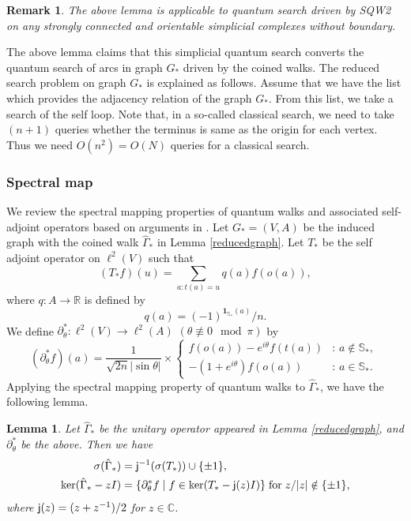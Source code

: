 \documentclass[a4paper,12pt]{article}
\newtheorem{lemma}[definition]{Lemma}
\newtheorem{remark}[definition]{Remark}
\newcommand{\bs}[1]{\boldsymbol{#1}}
\numberwithin{equation}{section}
\begin{document}
{\rm
\begin{remark}
The above lemma is applicable to quantum search driven by SQW2 on any strongly connected and orientable simplicial complexes without boundary. 
\end{remark}
}

The above lemma claims that this simplicial quantum search converts the quantum search of arcs in graph $G_*$ driven by the coined walks. 
The reduced search problem on graph $G_*$ is explained as follows. 
Assume that we have the list which provides the adjacency relation of the graph $G_*$. 
From this list, we take a search of the self loop. 
Note that, in a so-called classical search, we need to take $(n+1)$ queries whether the terminus is same as the origin for each vertex. 
Thus we need $O(n^2)=O(N)$ queries for a classical search. 
%
\subsubsection{Spectral map}
We review the spectral mapping properties of quantum walks and associated self-adjoint operators based on arguments in \cite{MOSIIS}. 
Let $G_\ast=(V,A)$ be the induced graph with the coined walk $\hat{\Gamma}_\ast$ in Lemma \ref{reducedgraph}. 
Let $T_\ast$ be the self adjoint operator on $\ell^2(V)$ such that 
\begin{equation}
\label{T_ast}
        (T_\ast f)(u)= \sum_{a:t(a)=u}q(a)f(o(a)), 
\end{equation}
where $q: A\to\mathbb{R}$ is defined by 	
	\[ q(a)=(-1)^{\bs{1}_{\mathbb{S}_\ast}(a)}/n.  \]
We define $\partial^*_\theta: \ell^2(V)\to \ell^2(A)$ $(\theta\not \equiv 0 \mod\pi )$ by 
\begin{equation*}
(\partial^*_\theta f)(a)=\frac{1}{\sqrt{2n}|\sin \theta|} \times 
\begin{cases}
	f(o(a))-e^{i\theta}f(t(a)) & \text{: $a\notin \mathbb{S}_\ast$, } \\
	-(1+e^{i\theta})f(o(a)) & \text{: $a\in \mathbb{S}_\ast$. }
\end{cases}
\end{equation*}
Applying the spectral mapping property of quantum walks to $\hat \Gamma_\ast$, we have the following lemma.
\begin{lemma}\label{spectral}
Let $\hat \Gamma_\ast$ be the unitary operator appeared in Lemma \ref{reducedgraph}, and $\partial_\theta^\ast$ be the above. 
Then we have 
	\begin{align*}
        \sigma(\hat \Gamma_\ast) &= {\sf j}^{-1}(\sigma(T_\ast)) \cup \{\pm 1\},  \\
        \ker(\hat \Gamma_\ast-zI) &= \{ \partial^*_\theta f \;|\; f\in\ker(T_\ast-{\sf j}(z)I ) \} \;\mathrm{for}\;z/|z|\notin \{\pm 1\},
        \end{align*}
where ${\sf j}(z) = (z+z^{-1})/2$ for $z\in \mathbb{C}$. 
\end{lemma}
\end{document}
